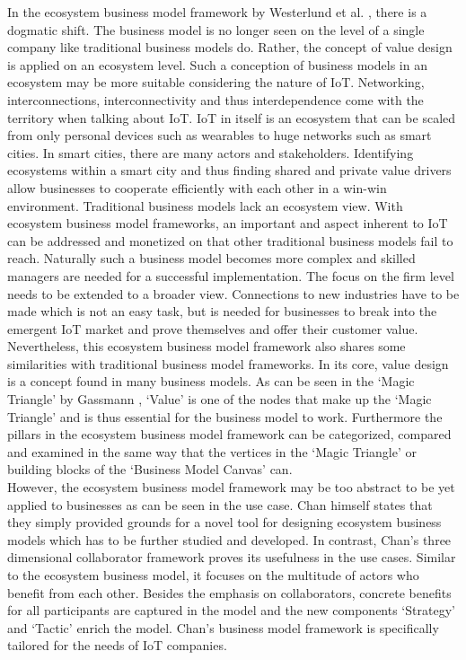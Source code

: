 		In the ecosystem business model framework by Westerlund et al. \cite{westerlund}, there is a dogmatic shift. The business model is no longer seen on the level of a single company like traditional business models do. Rather, the concept of value design is applied on an ecosystem level. Such a conception of business models in an ecosystem may be more suitable considering the nature of IoT. Networking, interconnections, interconnectivity and thus interdependence come with the territory when talking about IoT. IoT in itself is an ecosystem that can be scaled from only personal devices such as wearables to huge networks such as smart cities. In smart cities, there are many actors and stakeholders. Identifying ecosystems within a smart city and thus finding shared and private value drivers allow businesses to cooperate efficiently with each other in a win-win environment. Traditional business models lack an ecosystem view. With ecosystem business model frameworks, an important and aspect inherent to IoT can be addressed and monetized on that other traditional business models fail to reach. Naturally such a business model becomes more complex and skilled managers are needed for a successful implementation. The focus on the firm level needs to be extended to a broader view. Connections to new industries have to be made which is not an easy task, but is needed for businesses to break into the emergent IoT market and prove themselves and offer their customer value. Nevertheless, this ecosystem business model framework also shares some similarities with traditional business model frameworks. In its core, value design is a concept found in many business models. As can be seen in the `Magic Triangle' by Gassmann \cite{gassmann55}, `Value' is one of the nodes that make up the `Magic Triangle' and is thus essential for the business model to work. Furthermore the pillars in the ecosystem business model framework can be categorized, compared and examined in the same way that the vertices in the `Magic Triangle' or building blocks of the `Business Model Canvas' can.\\
		However, the ecosystem business model framework may be too abstract to be yet applied to businesses as can be seen in the use case. Chan himself states that they simply provided grounds for a novel tool for designing ecosystem business models which has to be further studied and developed. In contrast, Chan's three dimensional collaborator framework proves its usefulness in the use cases. Similar to the ecosystem business model, it focuses on the multitude of actors who benefit from each other. Besides the emphasis on collaborators, concrete benefits for all participants are captured in the model and the new components `Strategy' and `Tactic' enrich the model. Chan's business model framework is specifically tailored for the needs of IoT companies.
	\vspace{-2em}
